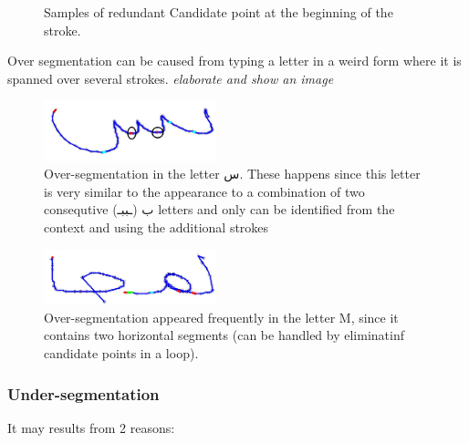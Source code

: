 \documentclass[journal,compsoc]{IEEEtran}
\begin{document}
\begin{figure}
\centering
    \caption{Samples of redundant Candidate point at the beginning of the  stroke.}
   \label{fig:oversegmentation_begin}
\end{figure}

Over segmentation can be caused from typing a letter in a weird form where it is spanned over several strokes. \emph{elaborate and show an image}

\begin{figure}
\centering
\includegraphics[width=5cm]{./figures/oversegmentation_s}
\caption{Over-segmentation in the letter س. These happens since this letter is very similar to the appearance to a combination of two consequtive ب (ـببـ) letters and only can be identified from the context and using the additional strokes }
\label{fig:oversegmentation_s}
\end{figure}

\begin{figure}
\centering
\includegraphics[width=5cm]{./figures/oversegmentation_m}
\caption{Over-segmentation appeared frequently in the letter M, since it contains two horizontal segments (can be handled by eliminatinf candidate points in a loop).}
\label{fig:oversegmentation_m}
\end{figure}

\subsubsection{Under-segmentation}
It may results from 2 reasons:
\end{document}
